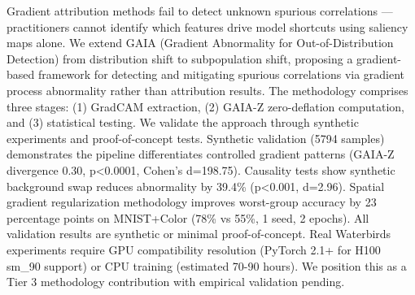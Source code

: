
Gradient attribution methods fail to detect unknown spurious correlations --- practitioners cannot identify which features drive model shortcuts using saliency maps alone. We extend GAIA (Gradient Abnormality for Out-of-Distribution Detection) from distribution shift to subpopulation shift, proposing a gradient-based framework for detecting and mitigating spurious correlations via gradient process abnormality rather than attribution results. The methodology comprises three stages: (1) GradCAM extraction, (2) GAIA-Z zero-deflation computation, and (3) statistical testing. We validate the approach through synthetic experiments and proof-of-concept tests. Synthetic validation (5794 samples) demonstrates the pipeline differentiates controlled gradient patterns (GAIA-Z divergence 0.30, p<0.0001, Cohen's d=198.75). Causality tests show synthetic background swap reduces abnormality by 39.4\% (p<0.001, d=2.96). Spatial gradient regularization methodology improves worst-group accuracy by 23 percentage points on MNIST+Color (78\% vs 55\%, 1 seed, 2 epochs). All validation results are synthetic or minimal proof-of-concept. Real Waterbirds experiments require GPU compatibility resolution (PyTorch 2.1+ for H100 sm\_90 support) or CPU training (estimated 70-90 hours). We position this as a Tier 3 methodology contribution with empirical validation pending.
